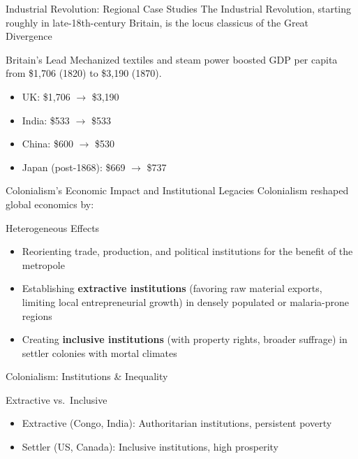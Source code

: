 \documentclass[aspectratio=169]{beamer}
\begin{document}
\begin{frame}{Industrial Revolution: Regional Case Studies}
	The Industrial Revolution, starting roughly in late-18th-century Britain, is the locus
	classicus of the Great Divergence
  \begin{block}{Britain’s Lead}
    Mechanized textiles and steam power boosted GDP per capita from \$1,706 (1820) to \$3,190 (1870).
  \end{block}
  \vspace{0.5em}
  \begin{itemize}[<+->]
    \item UK: \$1,706 $\to$ \$3,190  
    \item India: \$533 $\to$ \$533  
    \item China: \$600 $\to$ \$530  
    \item Japan (post-1868): \$669 $\to$ \$737 
  \end{itemize}
\end{frame}

\begin{frame}{Colonialism’s Economic Impact and Institutional Legacies}
	Colonialism reshaped global economics by:
	\begin{block}{Heterogeneous Effects}
			\begin{itemize}
				\item Reorienting trade, production, and political institutions for the benefit of the
metropole
				\item Establishing \textbf{extractive institutions} (favoring raw material exports, limiting local
entrepreneurial growth) in densely populated or malaria-prone regions
				\item Creating \textbf{inclusive institutions} (with property rights, broader suffrage) in settler
colonies with mortal climates
			\end{itemize}
	\end{block}

\end{frame}

\begin{frame}{Colonialism: Institutions \& Inequality}
  \begin{block}{Extractive vs.\ Inclusive}
    \begin{itemize}[<+->]
      \item Extractive (Congo, India): Authoritarian institutions, persistent poverty  
      \item Settler (US, Canada): Inclusive institutions, high prosperity  
    \end{itemize}
  \end{block}
\end{frame}
\end{document}
